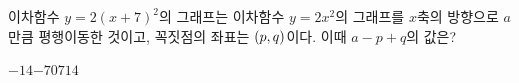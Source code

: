 이차함수 $y=2(x+7)^2$의 그래프는 이차함수 $y=2x^2$의 그래프를 $x$축의 방향으로 $a$만큼 평행이동한 것이고, 꼭짓점의 좌표는 $(p{,}\mkern3mu\mathopen{}q)$이다. 이때 $a-p+q$의 값은?
\begin{choices32}{$-14$}{$-7$}{$0$}{$7$}{$14$}\end{choices32}
